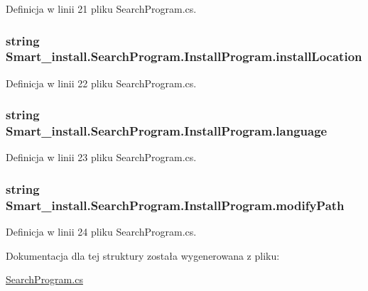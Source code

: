 Definicja w linii 21 pliku Search\+Program.\+cs.

\hypertarget{struct_smart__install_1_1_search_program_1_1_install_program_aaf8fac1b00267733b9b77b05eeea0cf8}{
\subsubsection[{install\+Location}]{\setlength{\rightskip}{0pt plus 5cm}string Smart\+\_\+install.\+Search\+Program.\+Install\+Program.\+install\+Location}}\label{struct_smart__install_1_1_search_program_1_1_install_program_aaf8fac1b00267733b9b77b05eeea0cf8}


Definicja w linii 22 pliku Search\+Program.\+cs.

\hypertarget{struct_smart__install_1_1_search_program_1_1_install_program_a8934b1419bdba4c690faec433c722d81}{
\subsubsection[{language}]{\setlength{\rightskip}{0pt plus 5cm}string Smart\+\_\+install.\+Search\+Program.\+Install\+Program.\+language}}\label{struct_smart__install_1_1_search_program_1_1_install_program_a8934b1419bdba4c690faec433c722d81}


Definicja w linii 23 pliku Search\+Program.\+cs.

\hypertarget{struct_smart__install_1_1_search_program_1_1_install_program_ac037e0544c982fbda344ce0fb8af4062}{
\subsubsection[{modify\+Path}]{\setlength{\rightskip}{0pt plus 5cm}string Smart\+\_\+install.\+Search\+Program.\+Install\+Program.\+modify\+Path}}\label{struct_smart__install_1_1_search_program_1_1_install_program_ac037e0544c982fbda344ce0fb8af4062}


Definicja w linii 24 pliku Search\+Program.\+cs.



Dokumentacja dla tej struktury została wygenerowana z pliku\+:\begin{DoxyCompactItemize}
\item 
\hyperlink{_search_program_8cs}{Search\+Program.\+cs}\end{DoxyCompactItemize}
